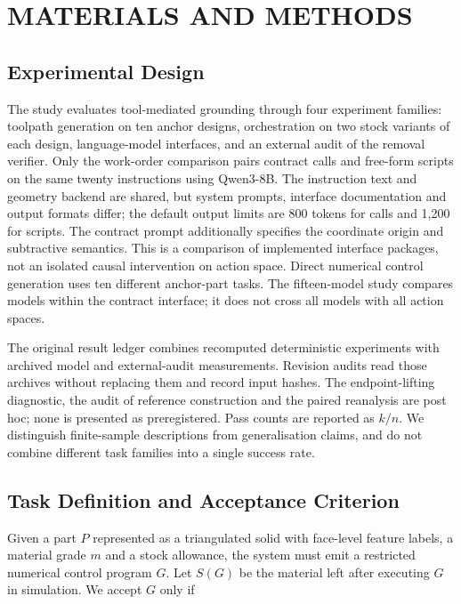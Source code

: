 \section{MATERIALS AND METHODS}

\subsection{Experimental Design}

The study evaluates tool-mediated grounding through four experiment families: toolpath generation on ten anchor designs, orchestration on two stock variants of each design, language-model interfaces, and an external audit of the removal verifier. Only the work-order comparison pairs contract calls and free-form scripts on the same twenty instructions using Qwen3-8B. The instruction text and geometry backend are shared, but system prompts, interface documentation and output formats differ; the default output limits are 800 tokens for calls and 1,200 for scripts. The contract prompt additionally specifies the coordinate origin and subtractive semantics. This is a comparison of implemented interface packages, not an isolated causal intervention on action space. Direct numerical control generation uses ten different anchor-part tasks. The fifteen-model study compares models within the contract interface; it does not cross all models with all action spaces.

The original result ledger combines recomputed deterministic experiments with archived model and external-audit measurements. Revision audits read those archives without replacing them and record input hashes. The endpoint-lifting diagnostic, the audit of reference construction and the paired reanalysis are post hoc; none is presented as preregistered. Pass counts are reported as $k/n$. We distinguish finite-sample descriptions from generalisation claims, and do not combine different task families into a single success rate.

\subsection{Task Definition and Acceptance Criterion}

Given a part $P$ represented as a triangulated solid with face-level feature labels, a material grade $m$ and a stock allowance, the system must emit a restricted numerical control program $G$. Let $S(G)$ be the material left after executing $G$ in simulation. We accept $G$ only if

